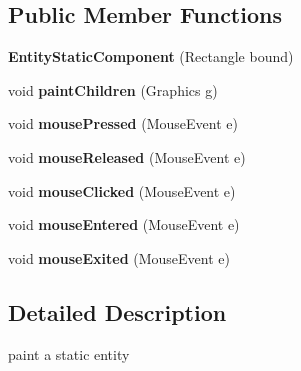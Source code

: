 \subsection*{Public Member Functions}
\begin{DoxyCompactItemize}
\item 
{\bfseries Entity\-Static\-Component} (Rectangle bound)\label{classdesmoj_1_1extensions_1_1visualization2d_1_1engine_1_1model_grafic_1_1_entity_static_component_afc4aac5ee42bd0fefec277c5b5f57cf2}

\item 
void {\bfseries paint\-Children} (Graphics g)\label{classdesmoj_1_1extensions_1_1visualization2d_1_1engine_1_1model_grafic_1_1_entity_static_component_a6e901cfc8d14a4dea569e8b730f262ac}

\item 
void {\bfseries mouse\-Pressed} (Mouse\-Event e)\label{classdesmoj_1_1extensions_1_1visualization2d_1_1engine_1_1model_grafic_1_1_entity_static_component_a2de09ca70e626b4f13c84bde103c3b8a}

\item 
void {\bfseries mouse\-Released} (Mouse\-Event e)\label{classdesmoj_1_1extensions_1_1visualization2d_1_1engine_1_1model_grafic_1_1_entity_static_component_a5b07bfdcd2cbd5ea7e9ba2ba3a64bb69}

\item 
void {\bfseries mouse\-Clicked} (Mouse\-Event e)\label{classdesmoj_1_1extensions_1_1visualization2d_1_1engine_1_1model_grafic_1_1_entity_static_component_a395cbbf34192ae3d82a781254c0ef825}

\item 
void {\bfseries mouse\-Entered} (Mouse\-Event e)\label{classdesmoj_1_1extensions_1_1visualization2d_1_1engine_1_1model_grafic_1_1_entity_static_component_a023bbdcec852228a16815b0f8fc5ec89}

\item 
void {\bfseries mouse\-Exited} (Mouse\-Event e)\label{classdesmoj_1_1extensions_1_1visualization2d_1_1engine_1_1model_grafic_1_1_entity_static_component_ac554e35fe9a03f02d3b37dd5d15b0ce1}

\end{DoxyCompactItemize}


\subsection{Detailed Description}
paint a static entity

